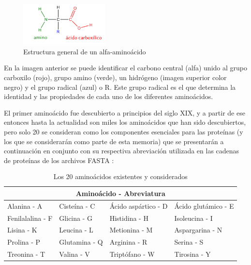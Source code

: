 \begin{figure}[h]
    \centering
    \includegraphics[width=0.4\textwidth]{./images/aminoacido}
    \caption{Estructura general de un alfa-aminoácido}
    \label{fig:image3}
\end{figure}

En la imagen anterior se puede identificar el carbono central (alfa) unido al grupo carboxilo (rojo), grupo amino (verde), un hidrógeno (imagen superior color negro) y el grupo radical (azul) o R. Este grupo radical es el que determina la identidad y las propiedades de cada uno de los diferentes aminoácidos.

El primer aminoácido fue descubierto a principios del siglo XIX, y a partir de ese entonces hasta la actualidad son miles los aminoácidos que han sido descubiertos, pero solo 20 se consideran como los componentes esenciales para las proteínas (y los que se considerarán como parte de esta memoria) que se presentarán a continuación en conjunto con su respectiva abreviación utilizada en las cadenas de proteínas de los archivos FASTA \cite{fasta}:

\begin{table}[H]
\centering
\label{my-label5}
\begin{tabular}{|l l l l|}
\hline
\multicolumn{4}{|c|}{Aminoácido - Abreviatura}\\ \hline
Alanina - A      & Cisteína - C       &      Ácido aspártico - D     & Ácido glutámico - E                     \\
Fenilalalina - F      &  Glicina - G           & Histidina - H     & Isoleucina - I                \\
Lisina - K      & Leucina - L            & Metionina - M           & Aspargarina - N          \\
Prolina - P      & Glutamina - Q          & Arginina - R                  & Serina - S                  \\
Treonina - T      & Valina - V          & Triptófano - W                      & Tirosina - Y   \\ \hline
\end{tabular}
\caption{Los 20 aminoácidos existentes y considerados}
\end{table}

